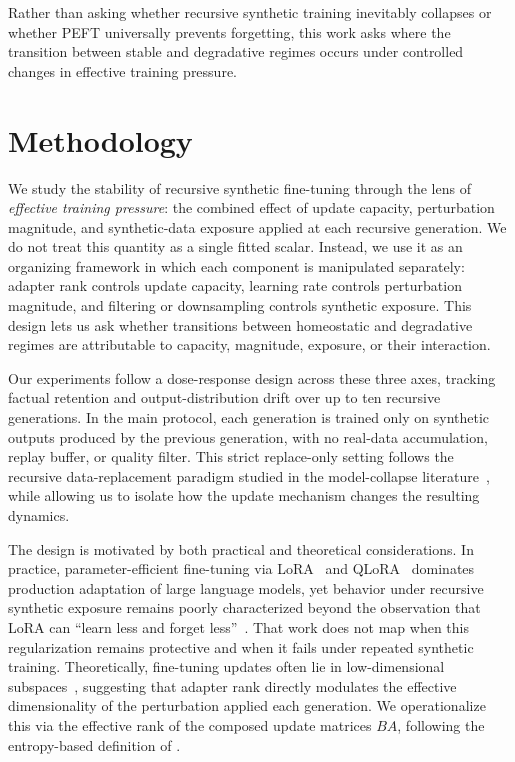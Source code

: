 \documentclass[a4paper,fleqn]{cas-dc}
\begin{document}
Rather than asking whether recursive synthetic training inevitably collapses or
whether PEFT universally prevents forgetting, this work asks where the
transition between stable and degradative regimes occurs under controlled
changes in effective training pressure.

\section{Methodology}\label{sec:methodology}

We study the stability of recursive synthetic fine-tuning through the lens of
\textit{effective training pressure}: the combined effect of update capacity,
perturbation magnitude, and synthetic-data exposure applied at each recursive
generation. We do not treat this quantity as a single fitted scalar. Instead, we
use it as an organizing framework in which each component is manipulated
separately: adapter rank controls update capacity, learning rate controls
perturbation magnitude, and filtering or downsampling controls synthetic
exposure. This design lets us ask whether transitions between homeostatic and
degradative regimes are attributable to capacity, magnitude, exposure, or their
interaction.

Our experiments follow a dose-response design across these three axes, tracking
factual retention and output-distribution drift over up to ten recursive
generations. In the main protocol, each generation is trained only on synthetic
outputs produced by the previous generation, with no real-data accumulation,
replay buffer, or quality filter. This strict replace-only setting follows the
recursive data-replacement paradigm studied in the model-collapse
literature~\citep{shumailov2024,dohmatob2025,gerstgrasser2024}, while allowing
us to isolate how the update mechanism changes the resulting dynamics.

The design is motivated by both practical and theoretical considerations. In
practice, parameter-efficient fine-tuning via LoRA~\citep{hu2022} and
QLoRA~\citep{dettmers2023} dominates production adaptation of large language
models, yet behavior under recursive synthetic exposure remains poorly
characterized beyond the observation that LoRA can ``learn less and forget
less''~\citep{biderman2024}. That work does not map when this regularization
remains protective and when it fails under repeated synthetic training.
Theoretically, fine-tuning updates often lie in low-dimensional
subspaces~\citep{aghajanyan2021}, suggesting that adapter rank directly
modulates the effective dimensionality of the perturbation applied each
generation. We operationalize this via the effective rank of the composed update
matrices $BA$, following the entropy-based definition of
\citet{roy2007}.
\end{document}
